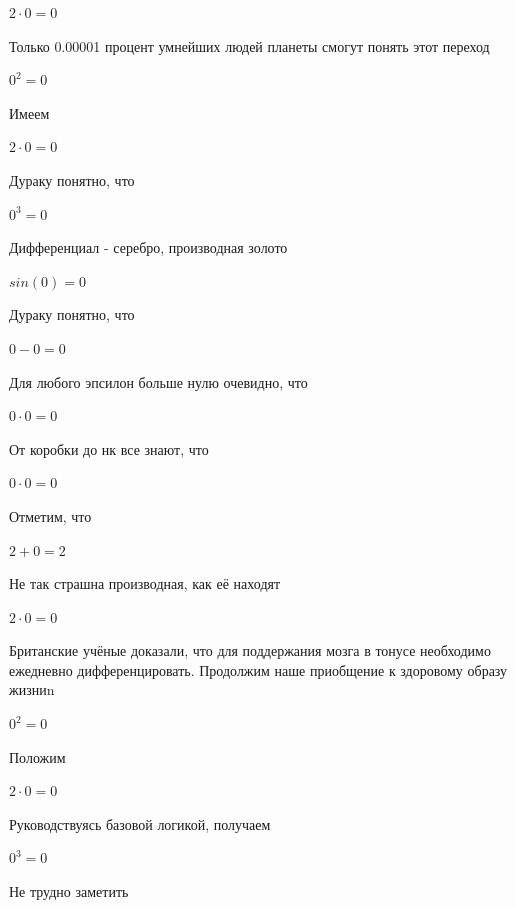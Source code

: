 \documentclass[12pt,a4paper,fleqn]{article}
\begin{document}
\begin{center}$2 \cdot 0 = 0$\end{center}
Только 0.00001 процент умнейших людей планеты смогут понять этот переход

\begin{center}$0^{2} = 0$\end{center}
Имеем

\begin{center}$2 \cdot 0 = 0$\end{center}
Дураку понятно, что

\begin{center}$0^{3} = 0$\end{center}
Дифференциал - серебро, производная золото\cite{link2}

\begin{center}$sin(0) = 0$\end{center}
Дураку понятно, что

\begin{center}$0-0 = 0$\end{center}
Для любого эпсилон больше нулю очевидно, что

\begin{center}$0 \cdot 0 = 0$\end{center}
От коробки до нк все знают, что

\begin{center}$0 \cdot 0 = 0$\end{center}
Отметим, что

\begin{center}$2+0 = 2$\end{center}
Не так страшна производная, как её находят\cite{link2}

\begin{center}$2 \cdot 0 = 0$\end{center}
Британские учёные доказали, что для поддержания мозга в тонусе необходимо ежедневно дифференцировать. Продолжим наше приобщение к здоровому образу жизниn

\begin{center}$0^{2} = 0$\end{center}
Положим

\begin{center}$2 \cdot 0 = 0$\end{center}
Руководствуясь базовой логикой, получаем

\begin{center}$0^{3} = 0$\end{center}
Не трудно заметить
\end{document}
